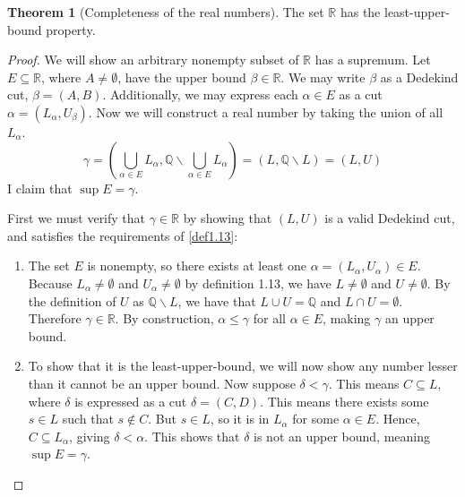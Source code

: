 \documentclass{article}
\newcommand{\R}{\mathbb{R}}
\newcommand{\Q}{\mathbb{Q}}
\theoremstyle{definition}
\newtheorem{theorem}{Theorem}[section]
\begin{document}
	\begin{theorem}[Completeness of the real numbers]
		The set $ \R $ has the least-upper-bound property.
		\begin{proof}
			We will show an arbitrary nonempty subset of $ \R $ has a supremum. Let $ E\subseteq \R $, where $ A\neq\emptyset $, have the upper bound $ \beta\in\R $. We may write $ \beta $ as a Dedekind cut, $ \beta=(A,B) $. Additionally, we may express each $ \alpha\in E $ as a cut $ \alpha=(L_\alpha,U_\beta) $. Now we will construct a real number by taking the union of all $ L_\alpha $.
			$$ \gamma=\left(\bigcup_{\alpha\in E}L_\alpha,\Q\backslash \bigcup_{\alpha\in E}L_\alpha\right)=(L,\Q\backslash
			L)=(L,U)$$  
			I claim that $ \sup E=\gamma $.
			
			First we must verify that $ \gamma\in\R $ by showing that $ (L,U) $ is a valid Dedekind cut, and satisfies the requirements of \cref{def1.13}: 
			\begin{enumerate}
				\item The set $ E $ is nonempty, so there exists at least one $ \alpha=(L_\alpha,U_\alpha)\in E $. Because $ L_\alpha\neq\emptyset $ and $ U_\alpha\neq\emptyset $ by definition 1.13, we have $ L\neq\emptyset $ and $ U\neq\emptyset $. By the definition of $ U $ as $ \Q\backslash L $, we have that $  L\cup U=\Q$ and $ L\cap U=\emptyset $. Therefore $ \gamma\in\R $. By construction, $ \alpha\le\gamma $ for all $ \alpha\in E $, making $ \gamma $ an upper bound. 
				\item To show that it is the least-upper-bound, we will now show any number lesser than it cannot be an upper bound. Now suppose $ \delta <\gamma $. This means $  C\subseteq L $, where $ \delta $ is expressed as a cut $ \delta=(C,D) $. This means there exists some $ s\in L $ such that $ s\notin C $. But $ s\in L $, so it is in $ L_\alpha $ for some $ \alpha\in E $. Hence, $ C\subseteq L_\alpha $, giving $ \delta <\alpha $. This shows that $ \delta $ is not an upper bound, meaning $ \sup E =\gamma$.
			\end{enumerate}
		\end{proof}
	\end{theorem}
	
\end{document}
